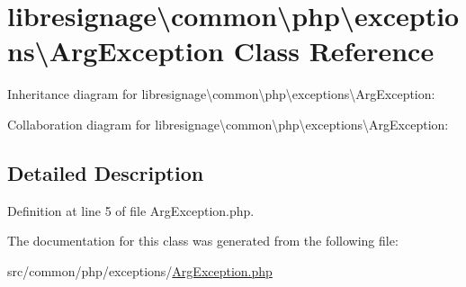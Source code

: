 \hypertarget{classlibresignage_1_1common_1_1php_1_1exceptions_1_1ArgException}{}\section{libresignage\textbackslash{}common\textbackslash{}php\textbackslash{}exceptions\textbackslash{}Arg\+Exception Class Reference}
\label{classlibresignage_1_1common_1_1php_1_1exceptions_1_1ArgException}


Inheritance diagram for libresignage\textbackslash{}common\textbackslash{}php\textbackslash{}exceptions\textbackslash{}Arg\+Exception\+:


Collaboration diagram for libresignage\textbackslash{}common\textbackslash{}php\textbackslash{}exceptions\textbackslash{}Arg\+Exception\+:


\subsection{Detailed Description}


Definition at line 5 of file Arg\+Exception.\+php.



The documentation for this class was generated from the following file\+:\begin{DoxyCompactItemize}
\item 
src/common/php/exceptions/\hyperlink{ArgException_8php}{Arg\+Exception.\+php}\end{DoxyCompactItemize}
